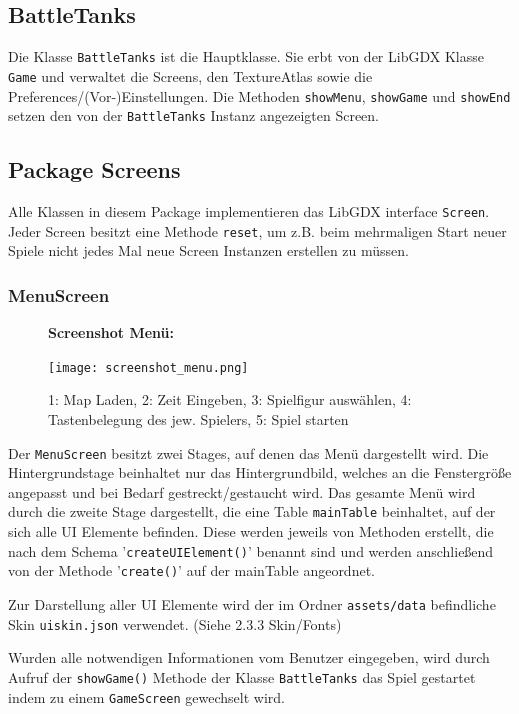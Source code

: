 \documentclass[a4paper]{scrreprt}
\def\code#1{\texttt{#1}}
\begin{document}
\subsection{BattleTanks}
Die Klasse \code{BattleTanks} ist die Hauptklasse. Sie erbt von der LibGDX Klasse \code{Game} und verwaltet die Screens, den TextureAtlas sowie die Preferences/(Vor-)Einstellungen.
Die Methoden \code{showMenu}, \code{showGame} und \code{showEnd} setzen den von der \code{BattleTanks} Instanz angezeigten Screen.

\newpage
\subsection{Package Screens}
Alle Klassen in diesem Package implementieren das LibGDX interface \code{Screen}. Jeder Screen besitzt eine Methode \code{reset}, um z.B. beim mehrmaligen Start neuer Spiele nicht jedes Mal neue Screen Instanzen erstellen zu müssen.
\subsubsection{MenuScreen}
\begin{figure}[H]
  \textbf{Screenshot Menü:}\par\medskip
  \centering
\texttt{[image: screenshot\_menu.png]}
\caption{1: Map Laden, 2: Zeit Eingeben, 3: Spielfigur auswählen, 4: Tastenbelegung des jew. Spielers,
5: Spiel starten}
\end{figure}


Der \code{MenuScreen} besitzt zwei Stages, auf denen das Menü dargestellt wird. Die Hintergrundstage beinhaltet nur das Hintergrundbild, welches an die Fenstergröße angepasst und bei Bedarf gestreckt/gestaucht wird.
Das gesamte Menü wird durch die zweite Stage dargestellt, die eine Table \code{mainTable} beinhaltet, auf der sich alle UI Elemente befinden. Diese werden jeweils von Methoden erstellt, die nach dem Schema '\code{createUIElement()}' benannt sind und werden anschließend von der Methode '\code{create()}' auf der mainTable angeordnet.


Zur Darstellung aller UI Elemente wird der im Ordner \code{assets/data} befindliche Skin \code{uiskin.json} verwendet. (Siehe 2.3.3 Skin/Fonts)

Wurden alle notwendigen Informationen vom Benutzer eingegeben, wird durch Aufruf der \code{showGame()} Methode der Klasse \code{BattleTanks} das Spiel gestartet indem zu einem \code{GameScreen} gewechselt wird.


\newpage
\end{document}
